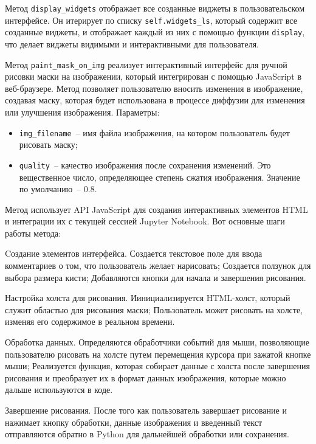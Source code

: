 Метод \lstinline{display_widgets} отображает все созданные виджеты в пользовательском интерфейсе. Он итерирует по списку \lstinline{self.widgets_ls}, который содержит все созданные виджеты, и отображает каждый из них с помощью функции \lstinline{display}, что делает виджеты видимыми и интерактивными для пользователя.

Метод \lstinline{paint_mask_on_img} реализует интерактивный интерфейс для ручной рисовки маски на изображении, который интегрирован с помощью JavaScript в веб-браузере. Метод позволяет пользователю вносить изменения в изображение, создавая маску, которая будет использована в процессе диффузии для изменения или улучшения изображения. Параметры:

\begin{itemize}
    \item \lstinline{img_filename}~-- имя файла изображения, на котором пользователь будет рисовать маску;
    \item \lstinline{quality}~-- качество изображения после сохранения изменений. Это вещественное число, определяющее степень сжатия изображения. Значение по умолчанию~-- 0.8.
\end{itemize}

Метод использует API JavaScript для создания интерактивных элементов HTML и интеграции их с текущей сессией Jupyter Notebook. Вот основные шаги работы метода:

\begin{enumerate_num}
    \item Cоздание элементов интерфейса. Создается текстовое поле для ввода комментариев о том, что пользователь желает нарисовать; Создается ползунок для выбора размера кисти; Добавляются кнопки для начала и завершения рисования.
    
    \item Настройка холста для рисования. Иинициализируется HTML-холст, который служит областью для рисования маски; Пользователь может рисовать на холсте, изменяя его содержимое в реальном времени.

    \item Обработка данных. Определяются обработчики событий для мыши, позволяющие пользователю рисовать на холсте путем перемещения курсора при зажатой кнопке мыши; Реализуется функция, которая собирает данные с холста после завершения рисования и преобразует их в формат данных изображения, которые можно дальше используются в коде.

    \item Завершение рисования. После того как пользователь завершает рисование и нажимает кнопку обработки, данные изображения и введенный текст отправляются обратно в Python для дальнейшей обработки или сохранения.
\end{enumerate_num}

